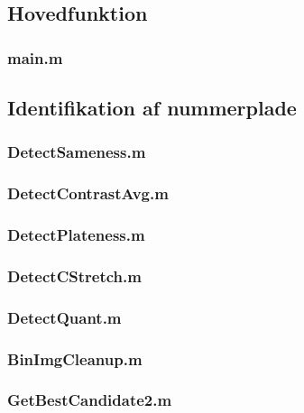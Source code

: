 \documentclass[11pt,a4paper,final]{article}
\begin{document}
\subsection{Hovedfunktion}
\subsubsection{main.m}
\label{code:main}


\subsection{Identifikation af nummerplade}
\subsubsection{DetectSameness.m}
\label{code:DetectSameness}


\subsubsection{DetectContrastAvg.m}
\label{code:DetectContrastAvg}


\subsubsection{DetectPlateness.m}
\label{code:DetectPlateness}


\subsubsection{DetectCStretch.m}
\label{code:DetectCStretch}


\subsubsection{DetectQuant.m}
\label{code:DetectQuant}


\subsubsection{BinImgCleanup.m}
\label{code:BinImgCleanup}


\subsubsection{GetBestCandidate2.m}
\label{code:GetBestCandidate}

\end{document}
